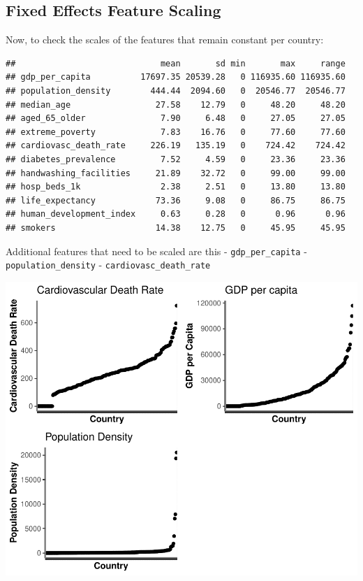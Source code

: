 \documentclass[11pt,preprint, authoryear]{elsarticle}
\numberwithin{equation}{section}
\numberwithin{figure}{section}
\numberwithin{table}{section}
\begin{document}
\hypertarget{fixed-effects-feature-scaling}{%
\subsection{Fixed Effects Feature
Scaling}\label{fixed-effects-feature-scaling}}

Now, to check the scales of the features that remain constant per
country:

\begin{verbatim}
##                             mean       sd min       max     range
## gdp_per_capita          17697.35 20539.28   0 116935.60 116935.60
## population_density        444.44  2094.60   0  20546.77  20546.77
## median_age                 27.58    12.79   0     48.20     48.20
## aged_65_older               7.90     6.48   0     27.05     27.05
## extreme_poverty             7.83    16.76   0     77.60     77.60
## cardiovasc_death_rate     226.19   135.19   0    724.42    724.42
## diabetes_prevalence         7.52     4.59   0     23.36     23.36
## handwashing_facilities     21.89    32.72   0     99.00     99.00
## hosp_beds_1k                2.38     2.51   0     13.80     13.80
## life_expectancy            73.36     9.08   0     86.75     86.75
## human_development_index     0.63     0.28   0      0.96      0.96
## smokers                    14.38    12.75   0     45.95     45.95
\end{verbatim}

Additional features that need to be scaled are this -
\texttt{gdp\_per\_capita} - \texttt{population\_density} -
\texttt{cardiovasc\_death\_rate}

\includegraphics{Cross_Section_Assignment_files/figure-latex/cons_plot-1.pdf}
\end{document}
